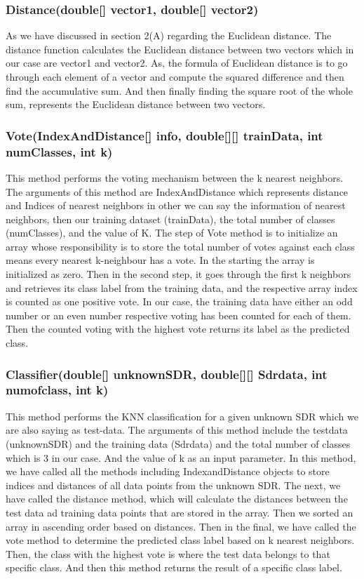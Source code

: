\documentclass[conference]{IEEEtran}
\begin{document}
\subsubsection{Distance(double[] vector1, double[] vector2)}
As we have discussed in section 2(A) regarding the Euclidean distance. The distance function calculates the Euclidean distance between two vectors which in our case are vector1 and vector2. As, the formula of Euclidean distance is to go through each element of a vector and compute the squared difference and then find the accumulative sum. And then finally finding the square root of the whole sum, represents the Euclidean distance between two vectors. 



\subsubsection{Vote(IndexAndDistance[] info, double[][] trainData, int numClasses, int k)}
This method performs the voting mechanism between the k nearest neighbors. The arguments of this method are IndexAndDistance which represents distance and Indices of nearest neighbors in other we can say the information of nearest neighbors, then our training dataset (trainData), the total number of classes (numClasses), and the value of K. The step of Vote method is to initialize an array whose responsibility is to store the total number of votes against each class means every nearest k-neighbour has a vote. In the starting the array is initialized as zero. Then in the second step, it goes through the first k neighbors and retrieves its class label from the training data, and the respective array index is counted as one positive vote. In our case, the training data have either an odd number or an even number respective voting has been counted for each of them. Then the counted voting with the highest vote returns its label as the predicted class. 


\subsubsection{Classifier(double[] unknownSDR, double[][] Sdrdata, int numofclass, int k)}
This method performs the KNN classification for a given unknown SDR which we are also saying as test-data. The arguments of this method include the testdata (unknownSDR) and the training data (Sdrdata) and the total number of classes which is 3 in our case. And the value of k as an input parameter. In this method, we have called all the methods including IndexandDistance objects to store indices and distances of all data points from the unknown SDR. The next, we have called the distance method, which will calculate the distances between the test data ad training data points that are stored in the array. Then we sorted an array in ascending order based on distances. Then in the final, we have called the vote method to determine the predicted class label based on k nearest neighbors. Then, the class with the highest vote is where the test data belongs to that specific class. And then this method returns the result of a specific class label. 
\end{document}
